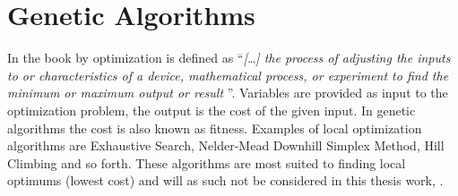 


\section{Genetic Algorithms}
\label{GeneticAlgorithm}
In the book  by \cite{Haupt2004} optimization is defined as ``\textit{[\dots] the process of adjusting the inputs to or characteristics of a device, mathematical process, or experiment to find the minimum or maximum output or result }''. Variables are provided as input to the optimization problem, the output is the cost of the given input. In genetic algorithms the cost is also known as fitness. Examples of local optimization algorithms are Exhaustive Search, Nelder-Mead Downhill Simplex Method, Hill Climbing and so forth. These algorithms are most suited to finding local optimums (lowest cost) and will as such not be considered in this thesis work, \parencite{Haupt2004}.

